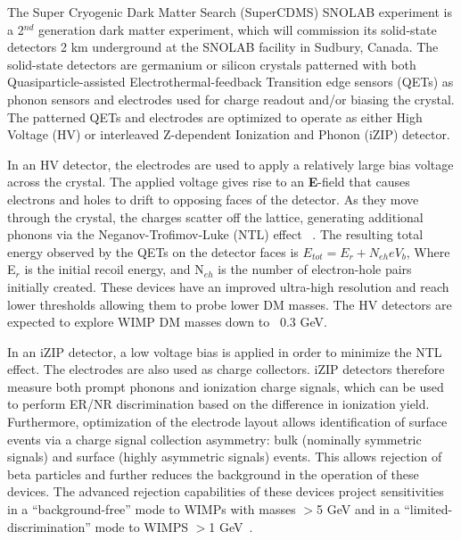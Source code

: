 The Super Cryogenic Dark Matter Search (SuperCDMS) SNOLAB experiment is a 2$^{nd}$ generation dark matter experiment, which will commission its solid-state detectors 2 km underground at the SNOLAB facility in Sudbury, Canada.  The solid-state detectors are germanium or silicon crystals patterned with both Quasiparticle-assisted Electrothermal-feedback Transition edge sensors (QETs) as phonon sensors and electrodes used for charge readout and/or biasing the crystal.  The patterned QETs and electrodes are optimized to operate as either High Voltage (HV) or interleaved Z-dependent Ionization and Phonon (iZIP) detector.

In an HV detector, the electrodes are used to apply a relatively large bias voltage across the crystal.  The applied voltage gives rise to an \textbf{E}-field that causes electrons and holes to drift to opposing faces of the detector. As they move through the crystal, the charges scatter off the lattice, generating additional phonons via the Neganov-Trofimov-Luke (NTL) effect ~\cite{Neganov1985, Luke1988}.  The resulting total energy observed by the QETs on the detector faces is $E_{tot} = E_r + N_{eh}eV_{b}$, Where E$_r$ is the initial recoil energy, and N$_{eh}$ is the number of electron-hole pairs initially created. These devices have an improved ultra-high resolution and reach lower thresholds allowing them to probe lower DM masses.  The HV detectors are expected to explore WIMP DM masses down to ~0.3 GeV. 

In an iZIP detector, a low voltage bias is applied in order to minimize the NTL effect. The electrodes are also used as charge collectors.   iZIP detectors therefore measure both prompt phonons and ionization charge signals, which can be used to perform ER/NR discrimination based on the difference in ionization yield. Furthermore, optimization of the electrode layout allows identification of surface events via a charge signal collection asymmetry: bulk (nominally symmetric signals) and surface (highly asymmetric signals) events.  This allows rejection of beta particles and further reduces the background in the operation of these devices. The advanced rejection capabilities of these devices project sensitivities in a ``background-free'' mode to WIMPs with masses $>$5 GeV and in a “limited-discrimination” mode to WIMPS $>$1 GeV~\cite{SCDMS2017}.

